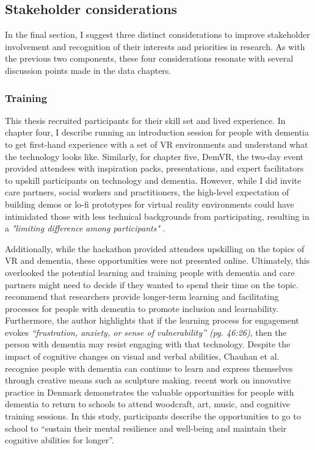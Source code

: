 \subsection{Stakeholder considerations}
\label{StakeholderConsideration}
In the final section, I suggest three distinct considerations to improve stakeholder involvement and recognition of their interests and priorities in research. As with the previous two components, these four considerations resonate with several discussion points made in the data chapters.

\subsubsection{Training}
\label{Training}
This thesis recruited participants for their skill set and lived experience. In chapter four, I describe running an introduction session for people with dementia to get first-hand experience with a set of VR environments and understand what the technology looks like. Similarly, for chapter five, DemVR, the two-day event provided attendees with inspiration packs, presentations, and expert facilitators to upskill participants on technology and dementia. However, while I did invite care partners, social workers and practitioners, the high-level expectation of building demos or lo-fi prototypes for virtual reality environments could have intimidated those with less technical backgrounds from participating, resulting in a \textit{"limiting difference among participants"} \citep{irani_hackathons_2015}. 

Additionally, while the hackathon provided attendees upskilling on the topics of VR and dementia, these opportunities were not presented online. Ultimately, this overlooked the potential learning and training people with dementia and care partners might need to decide if they wanted to spend their time on the topic. \cite{hwang2020exploring} recommend that researchers provide longer-term learning and facilitating processes for people with dementia to promote inclusion and learnability. Furthermore, the author highlights that if the learning process for engagement evokes \textit{``frustration, anxiety, or sense of vulnerability'' (pg. 46:26)}, then the person with dementia may resist engaging with that technology. Despite the impact of cognitive changes on visual and verbal abilities, Chauhan et al. recognise people with dementia can continue to learn and express themselves through creative means such as sculpture making. \cite{ward2020going}  recent work on innovative practice in Denmark demonstrates the valuable opportunities for people with dementia to return to schools to attend woodcraft, art, music, and cognitive training sessions. In this study, participants describe the opportunities to go to school to ``sustain their mental resilience and well-being and maintain their cognitive abilities for longer''.

